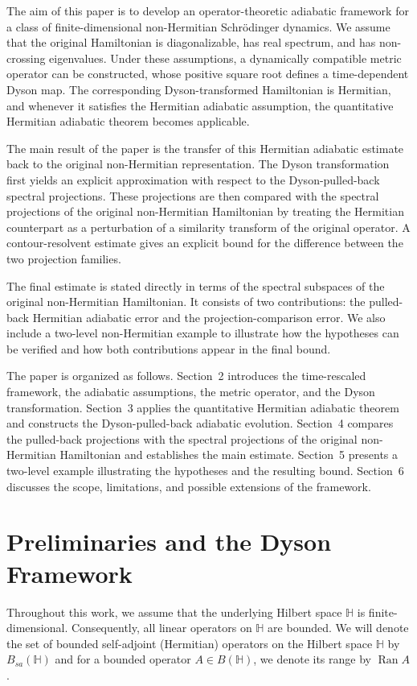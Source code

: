 \documentclass[pdflatex,sn-mathphys-num]{sn-jnl}
\theoremstyle{thmstyleone}
\theoremstyle{thmstyletwo}
\theoremstyle{thmstylethree}
\begin{document}
The aim of this paper is to develop an operator-theoretic adiabatic framework for a
class of finite-dimensional non-Hermitian Schr\"odinger dynamics. We assume that
the original Hamiltonian is diagonalizable, has real spectrum, and has
non-crossing eigenvalues. Under these assumptions, a dynamically
compatible metric operator can be constructed, whose
positive square root defines a time-dependent Dyson map. The corresponding
Dyson-transformed Hamiltonian is Hermitian, and whenever it satisfies the
Hermitian adiabatic assumption, the quantitative Hermitian adiabatic theorem
becomes applicable.

The main result of the paper is the transfer of this Hermitian adiabatic estimate
back to the original non-Hermitian representation. The Dyson transformation first yields an explicit approximation with respect to the Dyson-pulled-back spectral
projections. These projections are then compared with the spectral projections of
the original non-Hermitian Hamiltonian by treating the Hermitian counterpart as a
perturbation of a similarity transform of the original operator. A
contour-resolvent estimate gives an explicit bound for the difference between
the two projection families.

The final estimate is stated directly in terms of the spectral subspaces of the
original non-Hermitian Hamiltonian. It consists of two contributions: the
pulled-back Hermitian adiabatic error and the projection-comparison error. We
also include a two-level non-Hermitian example to illustrate how the hypotheses
can be verified and how both contributions appear in the final bound.

The paper is organized as follows. Section~2 introduces the time-rescaled
framework, the adiabatic assumptions, the metric operator, and the Dyson
transformation. Section~3 applies the quantitative Hermitian adiabatic theorem
and constructs the Dyson-pulled-back adiabatic evolution. Section~4 compares the
pulled-back projections with the spectral projections of the original
non-Hermitian Hamiltonian and establishes the main estimate. Section~5 presents
a two-level example illustrating the hypotheses and the resulting bound.
Section~6 discusses the scope, limitations, and possible extensions of the
framework.

\section{Preliminaries and the Dyson Framework}

Throughout this work, we assume that the underlying Hilbert space $\mathbb{H}$
is finite-dimensional. Consequently, all linear operators on $\mathbb{H}$ are
bounded. We will denote the set of bounded self-adjoint (Hermitian) operators on the Hilbert space $\mathbb{H}$ by $B_{sa}(\mathbb{H})$ and for a bounded operator $A \in B(\mathbb{H})$, we denote its range by
$\operatorname{Ran} A$.
\end{document}
